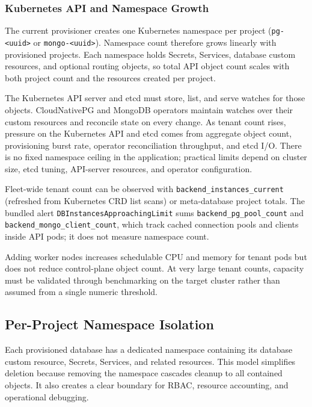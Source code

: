\subsubsection{Kubernetes API and Namespace Growth}

The current provisioner creates one Kubernetes namespace per project (\texttt{pg-<uuid>} or \texttt{mongo-<uuid>}). Namespace count therefore grows linearly with provisioned projects. Each namespace holds Secrets, Services, database custom resources, and optional routing objects, so total API object count scales with both project count and the resources created per project.

The Kubernetes API server and etcd must store, list, and serve watches for those objects. CloudNativePG and MongoDB operators maintain watches over their custom resources and reconcile state on every change. As tenant count rises, pressure on the Kubernetes API and etcd comes from aggregate object count, provisioning burst rate, operator reconciliation throughput, and etcd I/O. There is no fixed namespace ceiling in the application; practical limits depend on cluster size, etcd tuning, API-server resources, and operator configuration.

Fleet-wide tenant count can be observed with \texttt{backend\_instances\_current} (refreshed from Kubernetes CRD list scans) or meta-database project totals. The bundled alert \texttt{DBInstancesApproachingLimit} sums \texttt{backend\_pg\_pool\_count} and \texttt{backend\_mongo\_client\_count}, which track cached connection pools and clients inside API pods; it does not measure namespace count.

Adding worker nodes increases schedulable CPU and memory for tenant pods but does not reduce control-plane object count. At very large tenant counts, capacity must be validated through benchmarking on the target cluster rather than assumed from a single numeric threshold.

\subsection{Per-Project Namespace Isolation}

Each provisioned database has a dedicated namespace containing its database custom resource, Secrets, Services, and related resources. This model simplifies deletion because removing the namespace cascades cleanup to all contained objects. It also creates a clear boundary for RBAC, resource accounting, and operational debugging.


